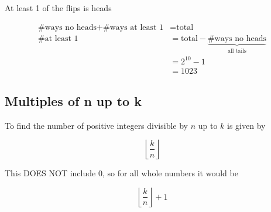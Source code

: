 \documentclass[../../Main.tex]{subfiles}
\begin{document}
\begin{example}
\begin{enumerate}
{\begin{alphabet}
                \item 
                {
                    At least 1 of the flips is heads
                    
                    \begin{align*}
                        \text{\# ways no heads} + \text{\# ways at least 1} &= \text{total} \\
                        \text{\# at least 1} &= \text{total} - \underbrace{\text{\# ways no heads}}_{\text{all tails}} \\
                        &= 2^{10} - 1 \\
                        &= \boxed{1023}
                    \end{align*}
                }
            \end{alphabet}
        }
    \end{enumerate}
    
\end{example}

\subsection{Multiples of n up to k}

\begin{theorem}
    To find the number of positive integers divisible by $n$ up to $k$ is given by

    $$\left\lfloor \frac{k}{n} \right\rfloor$$

    This DOES NOT include 0, so for all whole numbers it would be

    $$\left\lfloor \frac{k}{n} \right\rfloor + 1$$
\end{theorem}

\end{document}
